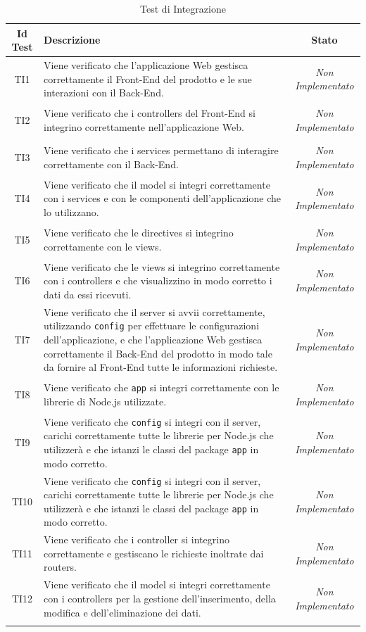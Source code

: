 \normalsize
\begin{longtable}[ht]{|c|>{}m{10cm}|c|}
\hline 
\textbf{Id Test} & \textbf{Descrizione} & \textbf{Stato}\\
\hline
\endhead
\hypertarget{TI1}{TI1} & Viene verificato che l’applicazione Web gestisca
correttamente il Front-End del prodotto e le sue interazioni
con il Back-End. & \textit{Non Implementato}\\ \hline
\hypertarget{TI2}{TI2} & Viene verificato che i controllers del Front-End si integrino
correttamente nell’applicazione Web. & \textit{Non Implementato}\\ \hline
\hypertarget{TI3}{TI3} & Viene verificato che i services permettano di interagire
correttamente con il Back-End. & \textit{Non Implementato}\\ \hline
\hypertarget{TI4}{TI4} & Viene verificato che il model si integri correttamente con i
services e con le componenti dell’applicazione che lo
utilizzano. & \textit{Non Implementato}\\ \hline
\hypertarget{TI5}{TI5} & Viene verificato che le directives si integrino correttamente
con le views. & \textit{Non Implementato}\\ \hline
\hypertarget{TI6}{TI6} & Viene verificato che le views si integrino correttamente con i
controllers e che visualizzino in modo corretto i dati da essi
ricevuti. & \textit{Non Implementato}\\ \hline
\hypertarget{TI7}{TI7} & Viene verificato che il server si avvii correttamente,
utilizzando \texttt{config} per effettuare le configurazioni
dell’applicazione, e che l’applicazione Web gestisca
correttamente il Back-End del prodotto in modo tale da
fornire al Front-End tutte le informazioni richieste. & \textit{Non Implementato}\\ \hline
\hypertarget{TI8}{TI8} & Viene verificato che \texttt{app} si integri correttamente con le
librerie di Node.js utilizzate. & \textit{Non Implementato}\\ \hline
\hypertarget{TI9}{TI9} & Viene verificato che \texttt{config} si integri con il server, carichi
correttamente tutte le librerie per Node.js che utilizzerà e
che istanzi le classi del package \texttt{app} in modo corretto. & \textit{Non Implementato}\\ \hline
\hypertarget{TI10}{TI10} & Viene verificato che \texttt{config} si integri con il server, carichi
correttamente tutte le librerie per Node.js che utilizzerà e
che istanzi le classi del package \texttt{app} in modo corretto. & \textit{Non Implementato}\\ \hline
\hypertarget{TI11}{TI11} & Viene verificato che i controller si integrino correttamente
e gestiscano le richieste inoltrate dai routers. & \textit{Non Implementato}\\ \hline
\hypertarget{TI12}{TI12} & Viene verificato che il model si integri correttamente con i
controllers per la gestione dell’inserimento, della modifica e
dell’eliminazione dei dati. & \textit{Non Implementato}\\ \hline
\caption[Test di Integrazione]{Test di Integrazione}
\label{tabella:test2}
\end{longtable}
\clearpage